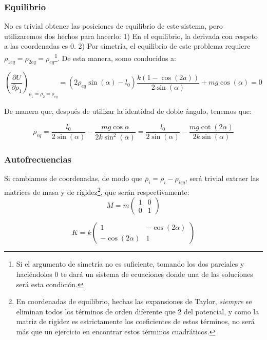 \documentclass[a4paper,12pt]{article}
\begin{document}
\subsubsection*{Equilibrio}

No es trivial obtener las posiciones de equilibrio de este sistema, pero utilizaremos dos hechos para hacerlo: 1) En el equilibrio, la derivada con respeto a las coordenadas es 0. 2) Por simetría, el equilibrio de este problema requiere $\rho_{1eq} = \rho_{2 eq} =\rho_{eq}$\footnote{Si el argumento de simetría no es suficiente, tomando los dos parciales y haciéndolos 0 te dará un sistema de ecuaciones donde una de las soluciones será esta condición.}. De esta manera, somo conducidos a:

$$\left(\frac{\partial U}{\partial \rho_1}\right)_{\rho_1 = \rho_2 = \rho_{eq}} = (2\rho_{eq} \sin(\alpha)-l_0)\frac{k(1-\cos(2a))}{2\sin(\alpha)} + mg\cos{(\alpha)} = 0$$

De manera que, después de utilizar la identidad de doble ángulo, tenemos que:

\begin{equation}
\label{eq}
\rho_{eq} = \frac{l_0}{2\sin(\alpha)} - \frac{mg \cos{\alpha}}{2k\sin^2(\alpha)} = \frac{l_0}{2\sin(\alpha)} - \frac{mg \cot{(2\alpha)}}{2k\sin(\alpha)}
\end{equation}

\subsubsection*{Autofrecuencias}
Si cambiamos de coordenadas, de modo que $\bar{\rho}_{i} = \rho_{i} - \rho_{i eq} $, será trivial extraer las matrices de masa y de rigidez\footnote{En coordenadas de equilibrio, hechas las expansiones de Taylor, \textit{siempre} se eliminan todos los términos de orden diferente que 2 del potencial, y como la matriz de rigidez es estrictamente los coeficientes de estos términos, no será más que un ejercicio en encontrar estos términos cuadráticos.}, que serán respectivamente: 
\begin{equation}
  M = m\begin{pmatrix}
    1&0\\0&1
  \end{pmatrix}
\end{equation}

\begin{equation}
  K = k\begin{pmatrix}
    1&-\cos{(2\alpha)}\\-\cos{(2\alpha)}&1
  \end{pmatrix}
\end{equation}
\end{document}
